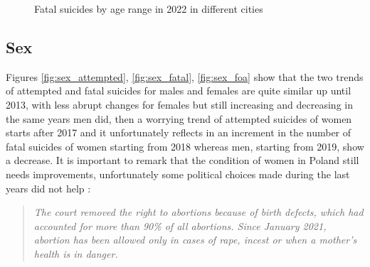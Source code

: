 \documentclass{article}
\begin{document}
\begin{figure}[H]
\begin{minipage}{0.65\textwidth}
        \caption{Fatal suicides by age range in 2022 in different cities}
	\label{fig:age_city_op-fat-2022}
    \end{minipage}
\end{figure}
%
%
%

%
\subsection{Sex}
Figures \ref{fig:sex_attempted}, \ref{fig:sex_fatal}, \ref{fig:sex_foa}
show that the two trends of attempted and fatal suicides for males and females
are quite similar up until 2013, with less abrupt changes for females but still
increasing and decreasing in the same years men did, then a worrying trend of attempted 
suicides of women starts after 2017 and it unfortunately reflects in an increment
in the number of fatal suicides of women starting from 2018 whereas men, starting from 2019, show a decrease.
It is important to remark that the condition of women in Poland still needs improvements,
unfortunately some political choices made during the last years did not help \footnotemark{}:
\begin{quote}
\textit{The court removed the right to abortions because of birth defects, 
which had accounted for more than 90\% of all abortions. Since January 2021, 
abortion has been allowed only in cases of rape, incest or when a mother's 
health is in danger.}
\end{quote}
%
\end{document}

